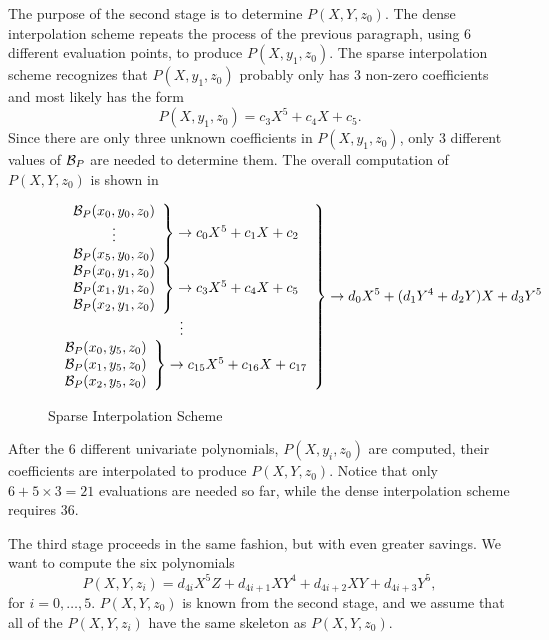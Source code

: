 The purpose of the second stage is to determine $P(X, Y, z_0)$.  The
dense interpolation scheme repeats the process of the previous
paragraph, using $6$ different evaluation points, to produce $P(X,
y_1, z_0)$.  The sparse interpolation scheme recognizes that $P(X,y_1,
z_0)$ probably only has $3$ non-zero coefficients and most likely has
the form
\[
P(X, y_1, z_0) = c_3 X^5 + c_4 X + c_5.
\]
Since there are only three unknown coefficients in $P(X, y_1, z_0)$,
only $3$ different values of ${\cal B}_P$ are needed to determine
them.  The overall computation of $P(X, Y, z_0)$ is shown in 
\begin{figure}
\small
\[
\hspace*{-1pt}\left.\begin{array}{c}
\left.\begin{array}{c}
{\cal B}_P(x_0, y_0, z_0) \\ \vdots \\ {\cal B}_P(x_5, y_0, z_0)
\end{array}\right\} \rightarrow c_0X^5 + c_1 X + c_2 \\
\left.\begin{array}{c}
{\cal B}_P(x_0, y_1, z_0) \\ {\cal B}_P(x_1, y_1, z_0) \\ 
{\cal B}_P(x_2, y_1, z_0)
\end{array}\right\} \rightarrow c_3X^5 + c_4 X + c_5 \\
\vdots \\
\left.\begin{array}{c}
{\cal B}_P(x_0, y_5, z_0) \\ {\cal B}_P(x_1, y_5, z_0) \\ 
{\cal B}_P(x_2, y_5, z_0)
\end{array}\right\} \rightarrow c_{15}X^5 + c_{16} X + c_{17} 
\end{array}\right\} \rightarrow d_0 X^5 + (d_1 Y^4 + d_2 Y) X + d_3 Y^5
\]
\normalsize
\caption{Sparse Interpolation Scheme\label{SI:SparseAlg:Fig}}
\end{figure}

After the $6$ different univariate polynomials, $P(X, y_i, z_0)$ are
computed, their coefficients are interpolated to produce $P(X, Y,
z_0)$.  Notice that only $6 + 5 \times 3 = 21$ evaluations are needed
so far, while the dense interpolation scheme requires $36$.

The third stage proceeds in the same fashion, but with even greater
savings.  We want to compute the six polynomials
\[
P(X, Y, z_i) = d_{4i} X^5 Z + d_{4i+1} X Y^4 + d_{4i+2} X Y + d_{4i+3} Y^5,
\]
for $i = 0, \ldots, 5$.  $P(X, Y, z_0)$ is known from the second
stage, and we assume that all of the $P(X, Y, z_i)$ have the same skeleton
as $P(X, Y, z_0)$.

